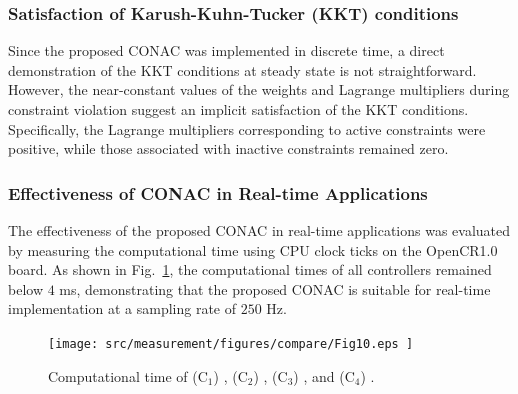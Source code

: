 \documentclass[journal]{IEEEtran}
\begin{document}
\hfill

\subsubsection{Satisfaction of Karush-Kuhn-Tucker (KKT) conditions}

Since the proposed CONAC was implemented in discrete time, a direct demonstration of the KKT conditions at steady state is not straightforward. 
However, the near-constant values of the weights and Lagrange multipliers during constraint violation suggest an implicit satisfaction of the KKT conditions. 
Specifically, the Lagrange multipliers corresponding to active constraints were positive, while those associated with inactive constraints remained zero.


\hfill

\subsubsection{Effectiveness of CONAC in Real-time Applications}

The effectiveness of the proposed CONAC in real-time applications was evaluated by measuring the computational time using CPU clock ticks on the OpenCR1.0 board. 
As shown in Fig.~\ref{fig:ctrl:real:result:cmp:time}, the computational times of all controllers remained below $4$ ms, demonstrating that the proposed CONAC is suitable for real-time implementation at a sampling rate of $250$ Hz.

\begin{figure}[t]
    \centering
        \texttt{[image: 
            src/measurement/figures/compare/Fig10.eps
        ]}%
    \caption{
        Computational time of (C$_1$) \protect{}, (C$_2$) \protect{}, (C$_3$) \protect{}, and (C$_4$) \protect{}.
    }
    \label{fig:ctrl:real:result:cmp:time}
  \end{figure}

\end{document}
